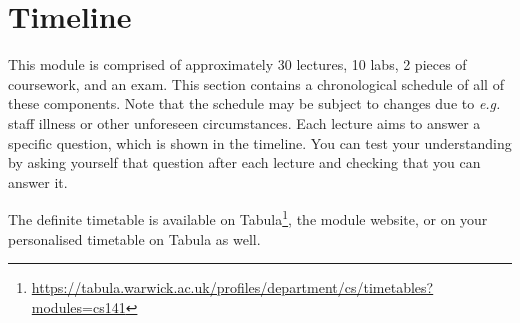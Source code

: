 \section{Timeline}
\label{sec:timeline}

This module is comprised of approximately 30 lectures, 10 labs, 2 pieces of coursework, and an exam. This section contains a chronological schedule of all of these components. Note that the schedule may be subject to changes due to \emph{e.g.} staff illness or other unforeseen circumstances. Each lecture aims to answer a specific question, which is shown in the timeline. You can test your understanding by asking yourself that question after each lecture and checking that you can answer it. 

The definite timetable is available on Tabula\footnote{\url{https://tabula.warwick.ac.uk/profiles/department/cs/timetables?modules=cs141}}, the module website, or on your personalised timetable on Tabula as well. 

\newcommand{\foo}{\makebox[0pt]{\textbullet}\hskip-0.5pt\vrule width 1pt\hspace{\labelsep}}

\newcommand{\LectureEntry}[4]{#1 & \begin{tabular}{p{11cm}}
		\textbf{#2} \\[-0.15cm]
		\emph{#3} \\
		#4
\end{tabular}}
\newcommand{\LabEntry}[3]{#1 & \begin{tabular}{p{11cm}}
		\textbf{#2} \\
		#3
\end{tabular}}


